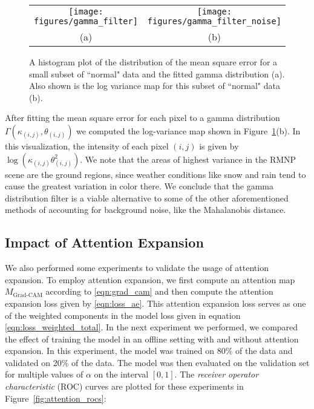 \documentclass[12pt]{article}
\begin{document}
\begin{figure}[H]
\begin{center}
\begin{tabular}{c c}
\texttt{[image: figures/gamma\_filter]} & \texttt{[image: figures/gamma\_filter\_noise]} \\
(a) & (b)
\end{tabular}
\end{center}

\caption{A histogram plot of the distribution of the mean square error for a small subset of ``normal" data and the fitted gamma distribution (a). Also shown is the log variance map for this subset of ``normal" data (b).}
\label{fig:gamma_filter}
\end{figure}

After fitting the mean square error for each pixel to a gamma distribution $\Gamma(\kappa_{(i,j)},\theta_{(i,j)})$ we computed the log-variance map shown in Figure~\ref{fig:gamma_filter}(b). In this visualization, the intensity of each pixel $(i,j)$ is given by $\log(\kappa_{(i,j)}\theta_{(i,j)}^2)$. We note that the areas of highest variance in the RMNP scene are the ground regions, since weather conditions like snow and rain tend to cause the greatest variation in color there. We conclude that the gamma distribution filter is a viable alternative to some of the other aforementioned methods of accounting for background noise, like the Mahalanobis distance.\\

\subsection{Impact of Attention Expansion}

We also performed some experiments to validate the usage of attention expansion. To employ attention expansion, we first compute an attention map $M_{\text{Grad-CAM}}$ according to \eqref{eqn:grad_cam} and then compute the attention expansion loss given by \eqref{eqn:loss_ae}. This attention expansion loss serves as one of the weighted components in the model loss given in equation \eqref{eqn:loss_weighted_total}. In the next experiment we performed, we compared the effect of training the model in an offline setting with and without attention expansion. In this experiment, the model was trained on 80\% of the data and validated on 20\% of the data. The model was then evaluated on the validation set for multiple values of $\alpha$ on the interval $[0,1]$. The \textit{receiver operator characteristic} (ROC) curves are plotted for these experiments in Figure~\ref{fig:attention_rocs}:
\end{document}
